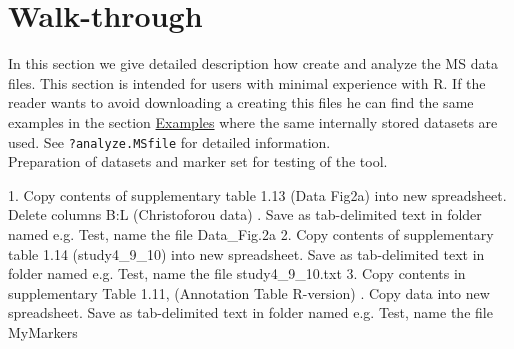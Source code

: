 \documentclass[a4paper]{article}
\numberwithin{equation}{subsection}
\begin{document}
\section{Walk-through}
In this section we give detailed description how create and analyze
the MS data files. This section is intended for users with minimal
experience with R. If the reader wants to avoid downloading a creating
this files he can find the same examples in the section \hyperref[examp_s]{Examples} where the same internally stored datasets are used.
See \texttt{?analyze.MSfile} for detailed information.
\\
Preparation of datasets and marker set for testing of the tool.

1. Copy contents of supplementary table 1.13 (Data Fig2a)  into new spreadsheet. Delete columns B:L (Christoforou data) . Save as tab-delimited text in folder named e.g. Test, name the file Data\_Fig.2a
2. Copy contents of supplementary table 1.14 (study4\_9\_10)  into new spreadsheet. Save as tab-delimited text in folder named e.g. Test, name the file study4\_9\_10.txt
3. Copy contents in supplementary Table 1.11, (Annotation Table R-version) . Copy data into new spreadsheet.  Save as tab-delimited text in folder named e.g. Test, name the file MyMarkers
\end{document}
